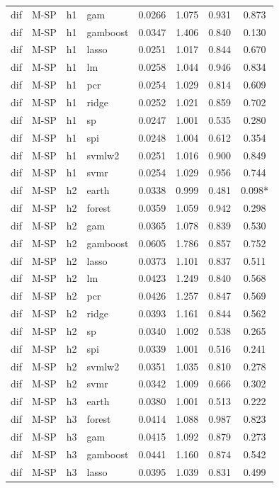 \begin{ThreePartTable}
\begin{longtable}[t]{llclcccc}
dif & M-SP & h1 & gam & 0.0266 & 1.075 & 0.931 & 0.873\\
dif & M-SP & h1 & gamboost & 0.0347 & 1.406 & 0.840 & 0.130\\
dif & M-SP & h1 & lasso & 0.0251 & 1.017 & 0.844 & 0.670\\
dif & M-SP & h1 & lm & 0.0258 & 1.044 & 0.946 & 0.834\\
dif & M-SP & h1 & pcr & 0.0254 & 1.029 & 0.814 & 0.609\\
dif & M-SP & h1 & ridge & 0.0252 & 1.021 & 0.859 & 0.702\\
dif & M-SP & h1 & sp & 0.0247 & 1.001 & 0.535 & 0.280\\
dif & M-SP & h1 & spi & 0.0248 & 1.004 & 0.612 & 0.354\\
dif & M-SP & h1 & svmlw2 & 0.0251 & 1.016 & 0.900 & 0.849\\
dif & M-SP & h1 & svmr & 0.0254 & 1.029 & 0.956 & 0.744\\
\addlinespace
dif & M-SP & h2 & earth & 0.0338 & 0.999 & 0.481 & 0.098*\\
dif & M-SP & h2 & forest & 0.0359 & 1.059 & 0.942 & 0.298\\
dif & M-SP & h2 & gam & 0.0365 & 1.078 & 0.839 & 0.530\\
dif & M-SP & h2 & gamboost & 0.0605 & 1.786 & 0.857 & 0.752\\
dif & M-SP & h2 & lasso & 0.0373 & 1.101 & 0.837 & 0.511\\
dif & M-SP & h2 & lm & 0.0423 & 1.249 & 0.840 & 0.568\\
dif & M-SP & h2 & pcr & 0.0426 & 1.257 & 0.847 & 0.569\\
dif & M-SP & h2 & ridge & 0.0393 & 1.161 & 0.844 & 0.562\\
dif & M-SP & h2 & sp & 0.0340 & 1.002 & 0.538 & 0.265\\
dif & M-SP & h2 & spi & 0.0339 & 1.001 & 0.516 & 0.241\\
dif & M-SP & h2 & svmlw2 & 0.0351 & 1.035 & 0.810 & 0.278\\
dif & M-SP & h2 & svmr & 0.0342 & 1.009 & 0.666 & 0.302\\
\addlinespace
dif & M-SP & h3 & earth & 0.0380 & 1.001 & 0.513 & 0.222\\
dif & M-SP & h3 & forest & 0.0414 & 1.088 & 0.987 & 0.823\\
dif & M-SP & h3 & gam & 0.0415 & 1.092 & 0.879 & 0.273\\
dif & M-SP & h3 & gamboost & 0.0441 & 1.160 & 0.874 & 0.542\\
dif & M-SP & h3 & lasso & 0.0395 & 1.039 & 0.831 & 0.499\\

\end{longtable}
\end{ThreePartTable}
